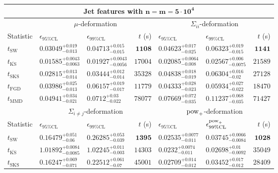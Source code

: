 \begin{tabular}{l|llr|llr}
	\toprule
	\multicolumn{7}{c}{{\bf Jet features with $\mathbf{n=m=5\cdot 10^{4}}$}} \\
	\toprule
	\multicolumn{1}{c}{} & \multicolumn{3}{c}{$\mu$-deformation} & \multicolumn{3}{c}{$\Sigma_{ii}$-deformation} \\
	Statistic & $\epsilon_{95\%\mathrm{CL}}$ & $\epsilon_{99\%\mathrm    {CL}}$ & $t$ (s) & $\epsilon_{95\%\mathrm{CL}}$ & $\epsilon_{99\%\mathrm{CL}}$ & $t$ (s) \\
	\midrule
	$t_{\mathrm{SW}}$ & $0.03049_{-0.013}^{+0.019}$ & $0.04713_{-0.015}^{+0.015}$ & ${\mathbf{1108}}$ & $0.04623_{-0.025}^{+0.017}$ & $0.06323_{-0.015}^{+0.019}$ & ${\mathbf{1141}}$ \\
	$t_{\overline{\mathrm{KS}}}$ & ${\mathbf{0.01585_{-0.0063}^{+0.0043}}}$ & ${\mathbf{0.01927_{-0.0056}^{+0.0043}}}$ & $17004$ & ${\mathbf{0.02085_{-0.008}^{+0.0064}}}$ & ${\mathbf{0.02567_{-0.0075}^{+0.006}}}$ & $21589$ \\
	$t_{\mathrm{SKS}}$ & $0.02815_{-0.014}^{+0.013}$ & $0.03444_{-0.014}^{+0.012}$ & $35328$ & $0.04838_{-0.019}^{+0.018}$ & $0.06304_{-0.02}^{+0.016}$ & $27128$ \\
	$t_{\mathrm{FGD}}$ & $0.03986_{-0.013}^{+0.025}$ & $0.06157_{-0.017}^{+0.019}$ & $11779$ & $0.04333_{-0.023}^{+0.028}$ & $0.05934_{-0.022}^{+0.027}$ & $18470$ \\
	$t_{\mathrm{MMD}}$ & $0.04941_{-0.021}^{+0.034}$ & $0.0712_{-0.022}^{+0.03}$ & $78077$ & $0.07669_{-0.035}^{+0.072}$ & $0.11237_{-0.035}^{+0.068}$ & $71427$ \\
	\toprule
	\multicolumn{1}{c}{} & \multicolumn{3}{c}{$\Sigma_{i\neq j}$-deformation} & \multicolumn{3}{c}{$\rm{pow}_{+}$-deformation} \\
	Statistic & $\epsilon_{95\%\mathrm{CL}}$ & $\epsilon_{99\%\mathrm{CL}}$ & $t$ (s) & $\epsilon_{95\%\mathrm{CL}}$ & $\epsilon^{\rm   {pow}_{+}}_{99\%\mathrm{CL}}$ & $t$ (s) \\
	\midrule
	$t_{\mathrm{SW}}$ & $0.16479_{-0.06}^{+0.051}$ & $0.26285_{-0.039}^{+0.053}$ & ${\mathbf{1395}}$ & $0.02535_{-0.011}^{+0.0077}$ & $0.03745_{-0.0084}^{+0.0066}$ & ${\mathbf{1028}}$ \\
	$t_{\overline{\mathrm{KS}}}$ & $1.01892_{-0.0085}^{+0.0084}$ & $1.02245_{-0.003}^{+0.011}$ & $14303$ & ${\mathbf{0.0232_{-0.011}^{+0.0074}}}$ & ${\mathbf{0.02698_{-0.0092}^{+0.01}}}$ & $35049$ \\
	$t_{\mathrm{SKS}}$ & $0.16247_{-0.071}^{+0.069}$ & $0.22512_{-0.07}^{+0.061}$ & $45001$ & $0.02709_{-0.012}^{+0.014}$ & $0.03452_{-0.012}^{+0.017}$ & $28409$ \\

\end{tabular}
